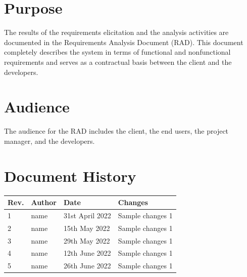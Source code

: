 \documentclass[a4paper,12pt]{scrartcl}
\begin{document}
    \section*{Purpose}
    The results of the requirements elicitation and the analysis activities are documented in the Requirements Analysis Document (RAD). This document completely describes the system in terms of functional and nonfunctional requirements and serves as a contractual basis between the client and the developers.

    \section*{Audience}
    The audience for the RAD includes the client, the end users, the project manager, and the developers.
    \nopagebreak

    \renewcommand{\contentsname}{Table of Contents}
    \tableofcontents
    \section*{Document History}

    \begin{tabular}{
        |p{}%
        |p{}%
        |p{}
        |p{}|%
    }
        \hline
        Rev. & Author & Date            & Changes          \\
        \hline
        1    & name   & 31st April 2022 & Sample changes 1 \\
        \hline
        2    & name   & 15th May 2022   & Sample changes 1 \\
        \hline
        3    & name   & 29th May 2022   & Sample changes 1 \\
        \hline
        4    & name   & 12th June 2022  & Sample changes 1 \\
        \hline
        5    & name   & 26th June 2022  & Sample changes 1 \\
        \hline
    \end{tabular}
    \newpage
    \sectionfont{\color[HTML]{355a8a}}
    \subsectionfont{\color[HTML]{4e81bc}}
    \subsubsectionfont{\color[HTML]{6b96c7}}
\end{document}
